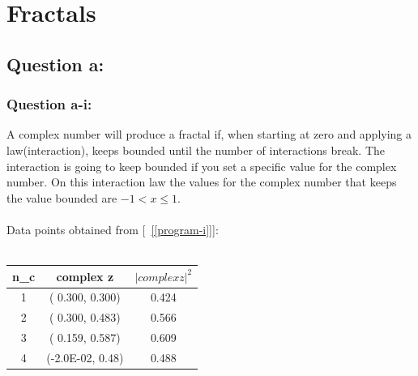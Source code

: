 \documentclass[twocolumn]{article}
\title{Lab#2\\Computational Physics I - Phys381}
\author{Guilherme Contesini , 10140201 \\ Gerswin Magat , 00325287}
\begin{document}
\maketitle

\newpage


\section{Fractals}


\subsection{Question a:}
\subsubsection{Question a-i:}
A complex number will produce a fractal if, when starting at zero and applying a law(interaction), keeps bounded until the number of interactions break.
The interaction is going to keep bounded if you set a specific value for the complex number. On this interaction law the values for the complex number that keeps the value bounded are $-1<x\leq1$.
\\
\\
Data points obtained from [~\ref{[program-i]}]:\\
\\
\begin{tabular}{|c|c|c|}
\hline
n_c & complex z & $|complex z|^2$\\\hline
1 & ( 0.300, 0.300) & 0.424 \\\hline
2 & ( 0.300, 0.483) & 0.566 \\\hline
3 & ( 0.159, 0.587) & 0.609 \\\hline 
4 & (-2.0E-02, 0.48) & 0.488 \\\hline 
\end{tabular}
\end{document}
